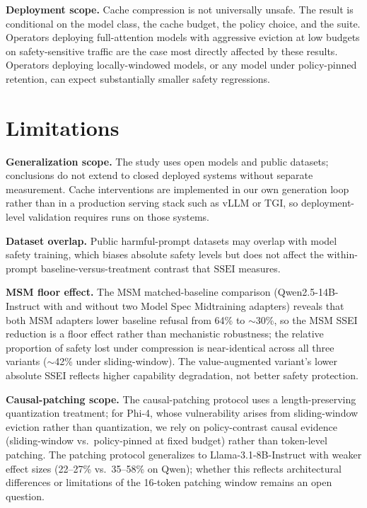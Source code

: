 \documentclass{article}
\newcommand{\ssei}{\mathrm{SSEI}}
\begin{document}
\textbf{Deployment scope.} Cache compression is not universally unsafe. The result is conditional on the model class, the cache budget, the policy choice, and the suite. Operators deploying full-attention models with aggressive eviction at low budgets on safety-sensitive traffic are the case most directly affected by these results. Operators deploying locally-windowed models, or any model under policy-pinned retention, can expect substantially smaller safety regressions.

\section{Limitations}

\textbf{Generalization scope.} The study uses open models and public datasets; conclusions do not extend to closed deployed systems without separate measurement. Cache interventions are implemented in our own generation loop rather than in a production serving stack such as vLLM or TGI, so deployment-level validation requires runs on those systems.

\textbf{Dataset overlap.} Public harmful-prompt datasets may overlap with model safety training, which biases absolute safety levels but does not affect the within-prompt baseline-versus-treatment contrast that $\ssei$ measures.

\textbf{MSM floor effect.} The MSM matched-baseline comparison (Qwen2.5-14B-Instruct with and without two Model Spec Midtraining adapters) reveals that both MSM adapters lower baseline refusal from 64\% to $\sim$30\%, so the MSM SSEI reduction is a floor effect rather than mechanistic robustness; the relative proportion of safety lost under compression is near-identical across all three variants ($\sim$42\% under sliding-window). The value-augmented variant's lower absolute SSEI reflects higher capability degradation, not better safety protection.

\textbf{Causal-patching scope.} The causal-patching protocol uses a length-preserving quantization treatment; for Phi-4, whose vulnerability arises from sliding-window eviction rather than quantization, we rely on policy-contrast causal evidence (sliding-window vs.\ policy-pinned at fixed budget) rather than token-level patching. The patching protocol generalizes to Llama-3.1-8B-Instruct with weaker effect sizes (22--27\% vs.\ 35--58\% on Qwen); whether this reflects architectural differences or limitations of the 16-token patching window remains an open question.
\end{document}
